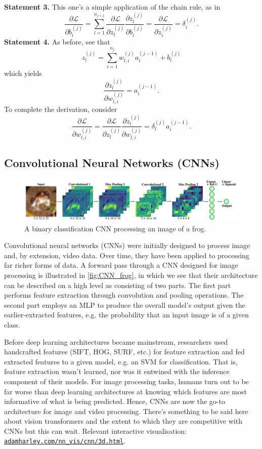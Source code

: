 \documentclass[11pt]{article}
\begin{document}
\vspace{10pt}
\noindent\textbf{Statement 3.} This one's a simple application of the chain rule, as in
$$
\frac{\partial\mathcal{L}}{\partial b_i^{(j)}}
=
\sum_{l=1}^{n_{j+1}}\frac{\partial\mathcal{L}}{\partial z_l^{(j)}}\frac{\partial z_l^{(j)}}{\partial b_i^{(j)}}
=
\frac{\partial\mathcal{L}}{\partial z_i^{(j)}}
=
\delta_i^{(j)}.
$$
\textbf{Statement 4.} As before, see that
$$
z_l^{(j)}
=
\sum_{i=1}^{n_j}w_{l,i}^{(j)}a_i^{(j-1)}+b_l^{(j)}
$$
which yields
$$
\frac{\partial z_l^{(j)}}{\partial w_{l,i}^{(j)}}
=
a_i^{(j-1)}.
$$
To complete the derivation, consider
$$
\frac{\partial\mathcal{L}}{\partial w_{l,i}^{(j)}}
=
\frac{\partial\mathcal{L}}{\partial z_l^{(j)}}\frac{\partial z_l^{(j)}}{\partial w_{l,i}^{(j)}}
=
\delta_l^{(j)}a_i^{(j-1)}.
$$

\subsection{Convolutional Neural Networks (CNNs)}
\label{subsec:conv_neural_networks}

\begin{figure}[t]
    \centering
    \includegraphics[width=1\textwidth]{./figures/neural_nets/CNN_frog.pdf}
    \caption{A binary classification CNN processing an image of a frog.}
    \label{fig:CNN_frog}
\end{figure}

Convolutional neural networks (CNNs) were initially designed to process image and, by extension, video data. Over time, they have been applied to processing far richer forms of data. A forward pass through a CNN designed for image processing is illustrated in \autoref{fig:CNN_frog}, in which we see that their architecture can be described on a high level as consisting of two parts. The first part performs feature extraction through convolution and pooling operations. The second part employs an MLP to produce the overall model's output given the earlier-extracted features, e.g. the probability that an input image is of a given class.

Before deep learning architectures became mainstream, researchers used handcrafted features (SIFT, HOG, SURF, etc.) for feature extraction and fed extracted features to a given model, e.g. an SVM for classification. That is, feature extraction wasn't learned, nor was it entwined with the inference component of their models. For image processing tasks, humans turn out to be far worse than deep learning architectures at knowing which features are most informative of what is being predicted. Hence, CNNs are now the go-to architecture for image and video processing. There's something to be said here about vision transformers and the extent to which they are competitive with CNNs but this can wait. Relevant interactive visualisation: \href{https://adamharley.com/nn_vis/cnn/3d.html}{\texttt{adamharley.com/nn\_vis/cnn/3d.html}}.
\end{document}
